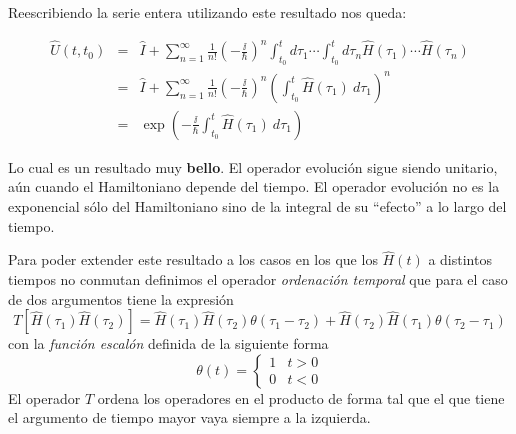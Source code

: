\documentclass{beamer}
\begin{document}
\begin{frame}
    Reescribiendo la serie entera utilizando este resultado nos queda:
    
    \begin{eqnarray*}
        \hat{U}(t,t_0)&=&\hat{I}+\sum_{n=1}^\infty
        \frac{1}{n!}
        \left(-\frac{\ii}{\hbar}\right)^n
        \int_{t_0}^{t}d\tau_{1}\cdots\int_{t_0}^{t}d\tau_n
        \hat{H}(\tau_1)\cdots\hat{H}(\tau_n)\\
        &=& \hat{I} +\sum_{n=1}^\infty
        \frac{1}{n!}
        \left(-\frac{\ii}{\hbar}\right)^n
        \left(\int_{t_0}^t\hat{H}(\tau_1)\ d\tau_1\right)^n \\
        &=& \exp\left(-\frac{\ii}{\hbar}\int_{t_0}^t\hat{H}(\tau_1)\ d\tau_1\right)
    \end{eqnarray*}

    Lo cual es un resultado muy {\bf bello}. El operador evolución sigue siendo unitario, aún cuando el Hamiltoniano depende del tiempo. El operador evolución no es la exponencial sólo del Hamiltoniano sino de la integral de su ``efecto'' a lo largo del tiempo.
\end{frame}

\begin{frame}
    Para poder extender este resultado a los casos en los que los $\hat{H}(t)$ a distintos tiempos no conmutan definimos el operador {\em ordenación temporal} que para el caso de dos argumentos tiene la expresión
    \begin{equation*}
    T[\hat{H}(\tau_1)\hat{H}(\tau_2)] = 
    \hat{H}(\tau_1)\hat{H}(\tau_2)\theta(\tau_1-\tau_2) +
    \hat{H}(\tau_2)\hat{H}(\tau_1)\theta(\tau_2-\tau_1)
    \end{equation*}
    con la {\em función escalón} definida de la siguiente forma
    \begin{equation*}
    \theta(t)=
    \left\{
    \begin{array}{cc}1&t>0\\0&t<0\end{array}
    \right.
    \end{equation*}
    El operador $T$ ordena los operadores en el producto de forma tal que el que tiene el argumento de tiempo mayor vaya siempre a la izquierda. 
\end{frame}
\end{document}

